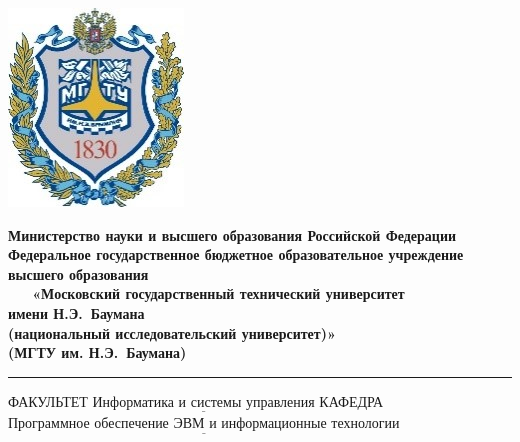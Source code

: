 \documentclass[12pt, a4paper]{report}
\begin{document}
\begin{titlepage}
	\noindent \begin{minipage}{0.15\textwidth}
	\includegraphics[width=\linewidth]{bauman_image}
	\end{minipage}
	\footnotesize\noindent \begin{minipage}{0.8\textwidth}\centering
		\textbf{Министерство науки и высшего образования Российской Федерации}\\
		\textbf{Федеральное государственное бюджетное образовательное учреждение}\\
		\textbf{высшего образования}\\
		\textbf{~~~«Московский государственный технический университет}\\
		\textbf{имени Н.Э.~Баумана}\\
		\textbf{(национальный исследовательский университет)»}\\
		\textbf{(МГТУ им. Н.Э.~Баумана)}
	\end{minipage}
	
	\noindent\rule{17cm}{3pt}
	\newline\newline
	\large\noindent ФАКУЛЬТЕТ $\underline{\text{Информатика и системы управления}}$ \newline\newline
	\noindent КАФЕДРА $\underline{\text{Программное обеспечение ЭВМ и информационные технологии}}$\newline\newline\newline\newline\newline
	

\end{titlepage}
\end{document}

